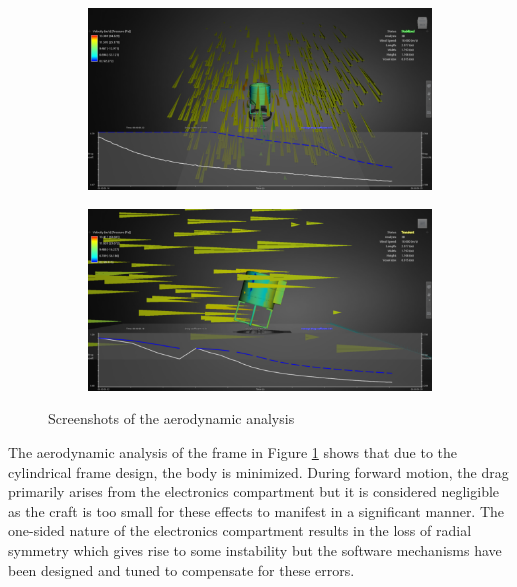 \documentclass[12pt]{article}
\begin{document}
\begin{figure}[h]
	\centering
	\begin{subfigure}{0.5\textwidth}
		\centering
		\includegraphics[width=0.9\linewidth]{aerodynamic-1.png}
	\end{subfigure}
	\begin{subfigure}{0.5\textwidth}
		\centering
		\includegraphics[width=0.9\linewidth]{aerodynamic-2.png}
	\end{subfigure}
	\caption{Screenshots of the aerodynamic analysis}
	\label{fig:aerodynamic}
\end{figure}

The aerodynamic analysis of the frame in Figure \ref{fig:aerodynamic} shows that due to the cylindrical frame design, the body is minimized. During forward motion, the drag primarily arises from the electronics compartment but it is considered negligible as the craft is too small for these effects to manifest in a significant manner. The one-sided nature of the electronics compartment results in the loss of radial symmetry which gives rise to some instability but the software mechanisms have been designed and tuned to compensate for these errors.
\end{document}
